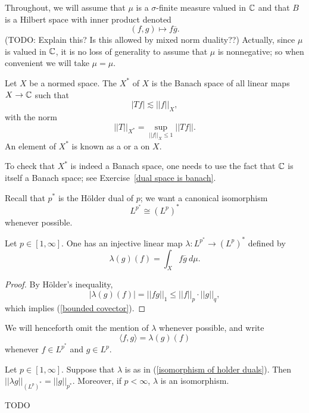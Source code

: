Throughout, we will assume that $\mu$ is a $\sigma$-finite measure valued in $\mathbb{C}$ and that $B$ is a Hilbert space with inner product denoted
\[(f, g) \mapsto f \overline g.\]
(TODO: Explain this? Is this allowed by mixed norm duality??)
Actually, since $\mu$ is valued in $\mathbb{C}$, it is no loss of generality to assume that $\mu$ is nonnegative; so when convenient we will take $\mu = \mu$.

\begin{definition}
Let $X$ be a normed space.
The  $X^*$ of $X$ is the Banach space of all linear maps $X \to \mathbb{C}$ such that
\begin{equation}\label{bounded covector}
|Tf| \lesssim ||f||_X,
\end{equation}
with the norm
\[||T||_{X^*} = \sup_{||f||_{X} \leq 1} ||Tf||.\]
An element of $X^*$ is known as a  or a  on $X$.
\end{definition}

To check that $X^*$ is indeed a Banach space, one needs to use the fact that $\mathbb{C}$ is itself a Banach space; see Exercise~\ref{dual space is banach}.

Recall that $p^*$ is the H\"older dual of $p$; we want a canonical isomorphism
\[L^{p^*} \cong (L^p)^*\]
whenever possible.

\begin{lemma}
Let $p \in [1, \infty]$.
One has an injective linear map $\lambda: L^{p^*} \to (L^p)^*$ defined by
\begin{equation}\label{isomorphism of holder duals}
\lambda(g)(f) = \int_{X} f\overline g ~d\mu.
\end{equation}
\end{lemma}
\begin{proof}
By H\"older's inequality,
\[|\lambda(g)(f)| = ||fg||_1 \leq ||f||_{p}  \cdot ||g||_q,\]
which implies (\ref{bounded covector}).
\end{proof}

We will henceforth omit the mention of $\lambda$ whenever possible, and write
\[\langle f, g\rangle = \lambda(g)(f)\]
whenever $f \in L^{p^*}$ and $g \in L^p$.

\begin{theorem}
Let $p \in [1, \infty]$.
Suppose that $\lambda$ is as in (\ref{isomorphism of holder duals}).
Then $||\lambda g||_{(L^p)^*} = ||g||_{p^*}$.
Moreover, if $p < \infty$, $\lambda$ is an isomorphism.
\end{theorem}
TODO

